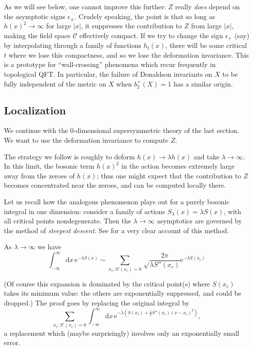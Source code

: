 \documentclass[12pt,letterpaper,reqno]{article}
\numberwithin{equation}{section}
\newcommand{\cC}{\ensuremath{\mathcal C}}
\newcommand{\half}{\ensuremath{\frac{1}{2}}}
\newcommand{\e}{{\mathrm e}}
\newcommand{\de}{\mathrm{d}}
\newcommand{\abs}[1]{\lvert#1\rvert}
\newcommand{\eps}{\epsilon}
\newcommand{\ti}[1]{\textit{#1}}
\begin{document}
As we will see below, one cannot improve this further: $Z$ really
\ti{does} depend on the asymptotic signs $\eps_{\pm}$.
Crudely speaking, the point is that so long as $h(x)^2 \to \infty$
for large $\abs{x}$, it suppresses the contribution to $Z$ 
from large $\abs{x}$, 
making the field space $\cC$ effectively compact. If we try to change
the sign $\eps_+$ (say) by interpolating through a family of functions 
$h_t(x)$, there will be some critical $t$ where we lose this compactness,
and so we lose the deformation invariance.
This is a prototype for ``wall-crossing'' phenomena 
which recur frequently in 
topological QFT. In particular, the failure of Donaldson invariants on $X$
to be fully independent of the metric 
on $X$ when $b_2^+(X) = 1$ has a similar origin.


\subsection{Localization}

We continue with the $0$-dimensional supersymmetric theory of the last section. We want to use the deformation invariance to compute $Z$.

The strategy we follow is roughly to deform $h(x) \to \lambda h(x)$ and take
$\lambda \to \infty$.
In this limit, the bosonic term $h(x)^2$ in the action becomes extremely
large away from the zeroes of $h(x)$; thus one might expect that 
the contribution to $Z$ becomes concentrated near the zeroes,
and can be computed locally there.

Let us recall how the analogous phenomenon plays out for a purely bosonic
integral in one dimension:
consider a family of actions $S_\lambda(x) = \lambda S(x)$,
with all critical points nondegenerate.
Then the $\lambda \to \infty$ asymptotics 
are governed by the method of \ti{steepest descent}.
See \cite{Bender1999} for a very clear account of this method.
\begin{prop} \label{prop:saddle-expansion-1d-bosonic}
As $\lambda \to \infty$ we have
\begin{equation}
  \int_{-\infty}^\infty \de x \, \e^{-\lambda S(x)} \sim \sum_{x_c: S'(x_c) = 0}
  \sqrt\frac{2 \pi}{\lambda S''(x_c)} \e^{-\lambda S(x_c)}
\end{equation}
\end{prop}
(Of course this expansion is dominated by the critical point(s) where
$S(x_c)$ takes its minimum value: the others are exponentially suppressed,
and could be dropped.)
The proof goes by replacing the original integral by
\begin{equation}
  \sum_{x_c: S'(x_c) = 0} \int_{-\infty}^\infty \de x \, \e^{-\lambda (S(x_c) + \half S''(x_c) (x-x_c)^2)},
\end{equation}
a replacement which (maybe surprisingly) involves only an exponentially small error.
\end{document}
